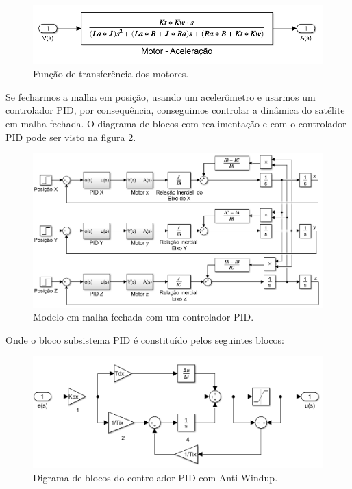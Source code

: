 \begin{figure}[H]
  \caption{Função de transferência dos motores.}
  \begin{center}
      \includegraphics[scale=.45]{metodologia/img/modelo_satelite_motor}
  \end{center}
  \label{fig:modelo_satelite_motor}
\end{figure}

Se fecharmos a malha em posição, usando um acelerômetro e usarmos um controlador PID, por consequência, conseguimos controlar a dinâmica do satélite em malha fechada. O diagrama de blocos com realimentação e com o controlador PID pode ser visto na figura \ref{fig:modelo_satelite_pid}. 

\begin{figure}[H]
  \caption{Modelo em malha fechada com um controlador PID.}
  \begin{center}
      \includegraphics[scale=.6]{metodologia/img/modelo_satelite_pid}
  \end{center}
  \label{fig:modelo_satelite_pid}
\end{figure}

Onde o bloco subsistema PID é constituído pelos seguintes blocos:

\begin{figure}[H]
  \caption{Digrama de blocos do controlador PID com Anti-Windup.}
  \begin{center}
      \includegraphics[scale=.45]{metodologia/img/matlab_pid_antiwindup}
  \end{center}
  \label{fig:simulink_modelo_completo_aberto}
\end{figure}

